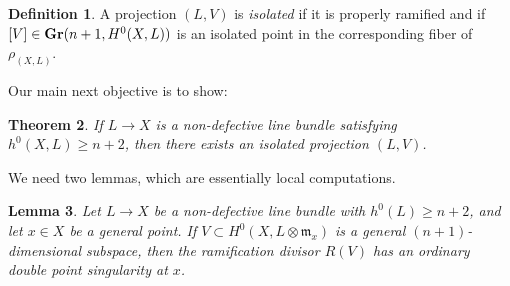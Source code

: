 \documentclass[11pt,reqno]{amsart}
\theoremstyle{plain}
\newtheorem{theorem}{Theorem}[section]
\newtheorem{lemma}[theorem]{Lemma}
\theoremstyle{definition}
\newtheorem{definition}[theorem]{Definition}
\theoremstyle{remark}
\numberwithin{equation}{section}
\renewcommand{\to}{{\longrightarrow}}
\numberwithin{equation}{section}
\begin{document}
\begin{definition}
   A projection $(L,V)$ is {\sl isolated} if it is properly ramified and if $[V] \in {\bf Gr}(n+1,H^{0}(X,L))$ is an isolated point in the corresponding fiber of $\rho_{(X,L)}$.
\end{definition}

Our main next objective is to show: 

\begin{theorem}
  \label{theorem:MainMain}
  If $L \to X$ is a non-defective line bundle satisfying $h^{0}(X,L) \geq n+2$, then there exists an isolated projection $(L,V)$.
\end{theorem}

We need two lemmas, which are essentially local computations.

\begin{lemma}\label{lemma:tangentconeRam}
  Let $L \to X$ be a non-defective line bundle with $h^{0}(L) \geq n+2$, and let $x \in X$ be a general point.  If $V \subset H^{0}(X,  L \otimes {\mathfrak m}_{x})$ is a general $(n+1)$-dimensional subspace, then the ramification divisor $R(V)$ has an ordinary double point singularity at $x$. 
\end{lemma}
\end{document}
